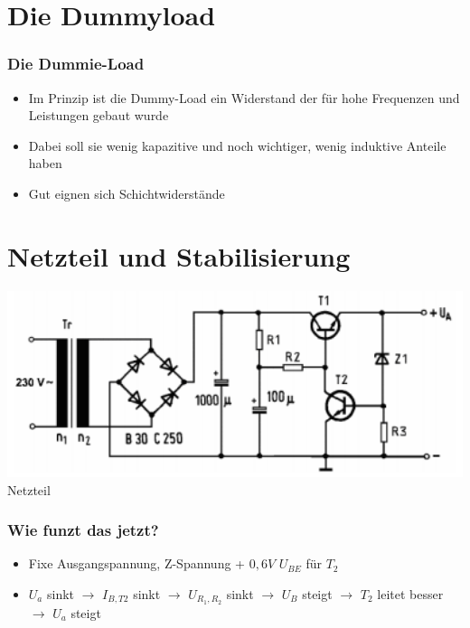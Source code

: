 \section*{Die Dummyload}

\begin{frame}
\frametitle{Die Dummie-Load}
\begin{itemize}
	\item	Im Prinzip ist die Dummy-Load ein Widerstand der für hohe Frequenzen und Leistungen gebaut wurde
	\item	Dabei soll sie wenig kapazitive und noch wichtiger, wenig induktive Anteile haben
	\item	Gut eignen sich Schichtwiderstände 
\end{itemize}
\end{frame}

\section*{Netzteil und Stabilisierung}
\begin{frame}
    \begin{center}
        \includegraphics[width=1\textwidth]{a17/TD306.png}\\
       Netzteil \cite{bna}
    \end{center}
\end{frame}

\begin{frame}
\frametitle{Wie funzt das jetzt?}
\begin{itemize}
	\item	Fixe Ausgangspannung, Z-Spannung + $0,6V$ $U_{BE}$ für $T_2$
	\item	$U_a$ sinkt $\rightarrow$	$I_{B,T2}$ sinkt $\rightarrow$ $U_{R_1,R_2}$ sinkt $\rightarrow$ $U_B$ steigt $\rightarrow$ $T_2$ leitet besser $\rightarrow$ $U_a$ steigt
\end{itemize}
\end{frame}

